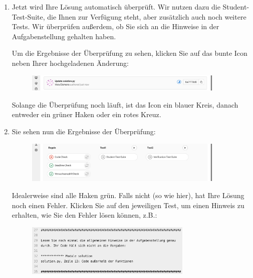 \documentclass{scrartcl}
\begin{document}
\begin{enumerate}
		\item Jetzt wird Ihre Lösung automatisch überprüft. Wir nutzen dazu die Student-Test-Suite, die Ihnen zur Verfügung steht, aber zusätzlich auch noch weitere Tests. Wir überprüfen außerdem, ob Sie sich an die Hinweise in der Aufgabenstellung gehalten haben.
		
		Um die Ergebnisse der Überprüfung zu sehen, klicken Sie auf das bunte Icon neben Ihrer hochgeladenen Änderung:
		
		\vfill
		
		\begin{figure}[h!]
			\centering
			\includegraphics[width=0.9\textwidth]{img/screenshot-pipeline-icon.png}
		\end{figure}
		
		\vfill
		
		Solange die Überprüfung noch läuft, ist das Icon ein blauer Kreis, danach entweder ein grüner Haken oder ein rotes Kreuz.
		
		\vfill
		
		\pagebreak
		
		\item Sie sehen nun die Ergebnisse der Überprüfung:
		
		\vfill
		
		\begin{figure}[h!]
			\centering
			\includegraphics[width=0.9\textwidth]{img/screenshot-pipeline-results.png}
		\end{figure}
		
		\vfill
		
		Idealerweise sind alle Haken grün. Falls nicht (so wie hier), hat Ihre Lösung noch einen Fehler. Klicken Sie auf den jeweiligen Test, um einen Hinweis zu erhalten, wie Sie den Fehler lösen können, z.B.:
		
		\vfill
		
		\begin{figure}[h!]
			\centering		
			\includegraphics[width=0.75\textwidth]{img/screenshot-hint.png}
		\end{figure}
		

\end{enumerate}
\end{document}
